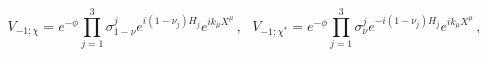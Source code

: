 \begin{equation}
 V_{-1;\chi}= e^{-\phi} \prod_{j=1}^3 \sigma_{1-\nu}^j
e^{i(1-\nu_j)H_j} e^{ik_\mu X^\mu}\, ,
  \ \ \
  V_{-1;\chi^*}= e^{-\phi} \prod_{j=1}^3 \sigma_\nu^j e^{-i(1-\nu_j)H_j}
  e^{ik_\mu X^\mu}\, ,\label{bos}
\end{equation}

